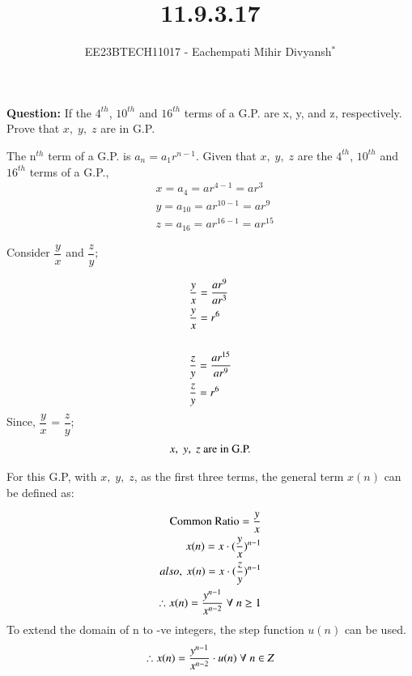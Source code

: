 \documentclass[journal,12pt,twocolumn]{IEEEtran}
\theoremstyle{remark}
\begin{document}

\vspace{3cm}

\title{11.9.3.17}
\author{EE23BTECH11017 - Eachempati Mihir Divyansh$^{*}$%
}
\maketitle
\newpage
\bigskip

\renewcommand{\thefigure}{\theenumi}
\renewcommand{\thetable}{\theenumi}

\textbf{Question: }
If the $4^{th}$, $10^{th}$ and $16^{th}$ terms of a G.P. are x, y, and z, respectively. Prove that $x,\; y,\; z$ are in G.P.\\
\solution


The n$^{th}$ term of a G.P. is $a_n=a_1r^{n-1}$. Given that $x,\; y,\; z$ are the $4^{th}$, $10^{th}$ and $16^{th}$ terms of a G.P.,
\begin{align}
     &x = a_4 =ar^{4-1}=ar^3 \\
     &y=a_{10}=ar^{10-1}=ar^9 \\
     &z=a_{16}=ar^{16-1}=ar^{15}
\end{align}

Consider $\dfrac{y}{x}$ and $\dfrac{z}{y}$;

\begin{align}
    &\dfrac{y}{x} = \dfrac{ar^9}{ar^3} \\
    &\dfrac{y}{x} = r^6\\ \notag\\
    &\dfrac{z}{y} = \dfrac{ar^{15}}{ar^9} \\ 
    &\dfrac{z}{y} = r^6
\end{align}
Since, $\dfrac{y}{x}$ = $\dfrac{z}{y}$;\\
\begin{align}  
\notag    x,\; y,\; z \text{ are in G.P.}
\end{align}

For this G.P, with $x,\;y,\;z$, as the first three terms, the general term $x(n)$ can be defined as: 

\begin{align}
\notag \text{Common Ratio}=\frac{y}{x} \\
 x(n)=x\cdot({\frac{y}{x}})^{n-1} \\
 also,\:x(n)=x\cdot (\frac{z}{y})^{n-1} \\
\notag \therefore x(n)=\frac{y^{n-1}}{x^{n-2}}\; \forall\; n\geq1
\end{align}
To extend the domain of n to -ve integers, the step function $u(n)$ can be used.
\begin{align}
\notag    \therefore x(n) = \frac{y^{n-1}}{x^{n-2}}\cdot u(n) \; \forall \;n\in Z
\end{align}
\end{document}
